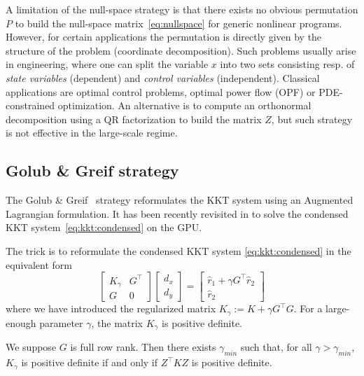 A limitation of the null-space strategy is that
there exists no obvious permutation $P$ to build the null-space
matrix~\eqref{eq:nullspace} for generic nonlinear programs. However, for certain applications the
permutation is directly given by the structure of the problem
(coordinate decomposition).
Such problems usually arise in engineering, where one can split
the variable $x$ into two sets consisting resp. of \emph{state variables} (dependent)
and \emph{control variables} (independent). Classical applications
are optimal control problems, optimal power flow (OPF) or PDE-constrained optimization.
An alternative is to compute an orthonormal decomposition using a QR factorization
to build the matrix $Z$, but such strategy is not effective in the
large-scale regime.



\subsection{Golub \& Greif strategy}
\label{sec:kkt:golubgreif}
The Golub \& Greif~\cite{golub2003solving} strategy reformulates the KKT system
using an Augmented Lagrangian formulation.
It has been recently revisited in \cite{regev2023hykkt}
to solve the condensed KKT system~\eqref{eq:kkt:condensed} on the GPU.

The trick is to reformulate the condensed KKT system \eqref{eq:kkt:condensed} in the equivalent form
\begin{equation}
  \label{eq:kkt:hykkt}
  \begin{bmatrix}
    K_\gamma & G^\top \\
    G & 0
  \end{bmatrix}
  \begin{bmatrix}
    d_x \\ d_y
  \end{bmatrix}
  =
  \begin{bmatrix}
    \hat{r}_1 + \gamma G^\top \hat{r}_2 \\
    \hat{r}_2
  \end{bmatrix}
\end{equation}
where we have introduced the regularized matrix $K_\gamma := K + \gamma G^\top G$.
For a large-enough parameter $\gamma$, the matrix $K_\gamma$ is positive definite.
\begin{proposition}
  We suppose $G$ is full row rank. Then there exists $\gamma_{min}$
  such that, for all $\gamma > \gamma_{min}$, $K_\gamma$ is positive definite
  if and only if $Z^\top K Z$ is positive definite.
\end{proposition}

